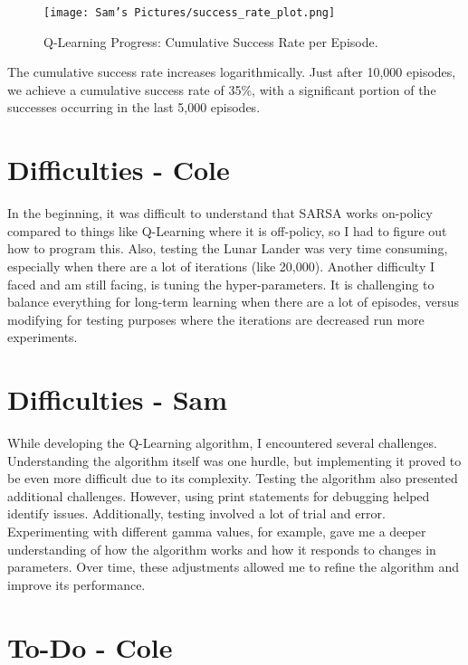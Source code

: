 \documentclass[journal]{IEEEtran}
\begin{document}
\begin{figure}[H]
    \centering
    \texttt{[image: Sam's Pictures/success\_rate\_plot.png]}
    \caption{Q-Learning Progress: Cumulative Success Rate per Episode.}
    \label{fig:sam_success}
\end{figure}

The cumulative success rate increases logarithmically. Just after 10,000 episodes, we achieve a cumulative success rate of 35\%, with a significant portion of the successes occurring in the last 5,000 episodes.

\section{Difficulties - Cole}

In the beginning, it was difficult to understand that SARSA works on-policy compared to things like Q-Learning where it is off-policy, so I had to figure out how to program this. Also, testing the Lunar Lander was very time consuming, especially when there are a lot of iterations (like 20,000). Another difficulty I faced and am still facing, is tuning the hyper-parameters. It is challenging to balance everything for long-term learning when there are a lot of episodes, versus modifying for testing purposes where the iterations are decreased run more experiments.

\section{Difficulties - Sam}

While developing the Q-Learning algorithm, I encountered several challenges. Understanding the algorithm itself was one hurdle, but implementing it proved to be even more difficult due to its complexity. Testing the algorithm also presented additional challenges. However, using print statements for debugging helped identify issues. Additionally, testing involved a lot of trial and error. Experimenting with different gamma values, for example, gave me a deeper understanding of how the algorithm works and how it responds to changes in parameters. Over time, these adjustments allowed me to refine the algorithm and improve its performance.

\section{To-Do - Cole}
\end{document}
